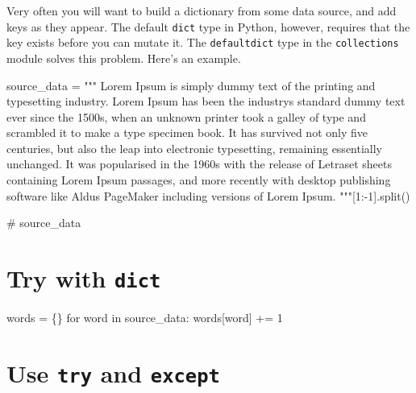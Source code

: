 \documentclass[
  letterpaper,
  DIV=11,
  numbers=noendperiod]{scrreprt}
\newenvironment{Shaded}{\begin{snugshade}}{\end{snugshade}}
\newcommand{\CommentTok}[1]{\textcolor[rgb]{0.37,0.37,0.37}{#1}}
\newcommand{\ControlFlowTok}[1]{\textcolor[rgb]{0.00,0.23,0.31}{#1}}
\newcommand{\DecValTok}[1]{\textcolor[rgb]{0.68,0.00,0.00}{#1}}
\newcommand{\KeywordTok}[1]{\textcolor[rgb]{0.00,0.23,0.31}{#1}}
\newcommand{\NormalTok}[1]{\textcolor[rgb]{0.00,0.23,0.31}{#1}}
\newcommand{\OperatorTok}[1]{\textcolor[rgb]{0.37,0.37,0.37}{#1}}
\newcommand{\StringTok}[1]{\textcolor[rgb]{0.13,0.47,0.30}{#1}}
\begin{document}
Very often you will want to build a dictionary from some data source,
and add keys as they appear. The default \texttt{dict} type in Python,
however, requires that the key exists before you can mutate it. The
\texttt{defaultdict} type in the \texttt{collections} module solves this
problem. Here's an example.

\begin{Shaded}
\begin{Highlighting}[]
\NormalTok{source\_data }\OperatorTok{=} \StringTok{"""}
\StringTok{Lorem Ipsum is simply dummy text of the printing and typesetting industry. }
\StringTok{Lorem Ipsum has been the industry\textquotesingle{}s standard dummy text ever since the 1500s, }
\StringTok{when an unknown printer took a galley of type and scrambled it to make a type }
\StringTok{specimen book. It has survived not only five centuries, but also the leap }
\StringTok{into electronic typesetting, remaining essentially unchanged. It was }
\StringTok{popularised in the 1960s with the release of Letraset sheets containing }
\StringTok{Lorem Ipsum passages, and more recently with desktop publishing software }
\StringTok{like Aldus PageMaker including versions of Lorem Ipsum.}
\StringTok{"""}\NormalTok{[}\DecValTok{1}\NormalTok{:}\OperatorTok{{-}}\DecValTok{1}\NormalTok{].split()}
\end{Highlighting}
\end{Shaded}

\begin{Shaded}
\begin{Highlighting}[]
\CommentTok{\# source\_data}
\end{Highlighting}
\end{Shaded}

\hypertarget{try-with-dict}{%
\section{\texorpdfstring{Try with
\texttt{dict}}{Try with dict}}\label{try-with-dict}}

\begin{Shaded}
\begin{Highlighting}[]
\NormalTok{words }\OperatorTok{=}\NormalTok{ \{\}}
\ControlFlowTok{for}\NormalTok{ word }\KeywordTok{in}\NormalTok{ source\_data:}
\NormalTok{    words[word] }\OperatorTok{+=} \DecValTok{1}
\end{Highlighting}
\end{Shaded}

\hypertarget{use-try-and-except}{%
\section{\texorpdfstring{Use \texttt{try} and
\texttt{except}}{Use try and except}}\label{use-try-and-except}}
\end{document}
